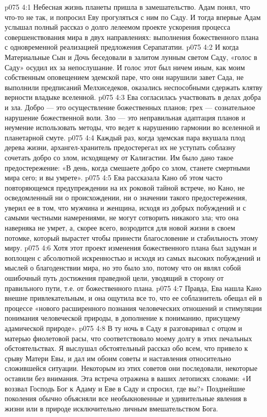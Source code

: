 \vs p075 4:1 Небесная жизнь планеты пришла в замешательство. Адам понял, что что\hyp{}то не так, и попросил Еву прогуляться с ним по Саду. И тогда впервые Адам услышал полный рассказ о долго лелеемом проекте ускорения процесса совершенствования мира в двух направлениях: выполнения божественного плана с одновременной реализацией предложения Серапататии.
\vs p075 4:2 И когда Материальные Сын и Дочь беседовали в залитом лунным светом Саду, «голос в Саду» осудил их за непослушание. И голос этот был ничем иным, как моим собственным оповещением эдемской паре, что они нарушили завет Сада, не выполнили предписаний Мелхиседеков, оказались неспособными сдержать клятву верности владыке вселенной.
\vs p075 4:3 Ева согласилась участвовать в делах добра и зла. Добро --- это осуществление божественных планов; грех --- сознательное нарушение божественной воли. Зло --- это неправильная адаптация планов и неумение использовать методы, что ведет к нарушению гармонии во вселенной и планетарной смуте.
\vs p075 4:4 Каждый раз, когда эдемская пара вкушала плод дерева жизни, архангел\hyp{}хранитель предостерегал их не уступать соблазну сочетать добро со злом, исходящему от Калигастии. Им было дано такое предостережение: «В день, когда смешаете добро со злом, станете смертными мира сего; и вы умрете».
\vs p075 4:5 Ева рассказала Кано об этом часто повторяющемся предупреждении на их роковой тайной встрече, но Кано, не осведомленный ни о происхождении, ни о значении такого предостережения, уверил ее в том, что мужчина и женщина, исходя из добрых побуждений и с самыми честными намерениями, не могут сотворить никакого зла; что она наверняка не умрет, а, скорее всего, возродится для новой жизни в своем потомке, который вырастет чтобы принести благословение и стабильность этому миру.
\vs p075 4:6 Хотя этот проект изменения божественного плана был задуман и воплощен с абсолютной искренностью и исходя из самых высоких побуждений и мыслей о благоденствии мира, но это было зло, потому что он являл собой ошибочный путь достижения праведной цели, уводящий в сторону от правильного пути, т.е. от божественного плана.
\vs p075 4:7 Правда, Ева нашла Кано внешне привлекательным, и она ощутила все то, что ее соблазнитель обещал ей в процессе «нового расширенного познания человеческих отношений и стимуляции понимания человеческой природы, в дополнение к пониманию, присущему адамической природе».
\vs p075 4:8 В ту ночь в Саду я разговаривал с отцом и матерью фиолетовой расы, что соответствовало моему долгу в этих печальных обстоятельствах. Я выслушал обстоятельный рассказ обо всем, что привело к срыву Матери Евы, и дал им обоим советы и наставления относительно сложившейся ситуации. Некоторым из этих советов они последовали, некоторые оставили без внимания. Эта встреча отражена в ваших летописях словами: «И воззвал Господь Бог к Адаму и Еве в Саду и спросил, где вы?» Позднейшие поколения обычно объясняли все необыкновенные и удивительные явления в жизни или в природе исключительно личным вмешательством Бога.

